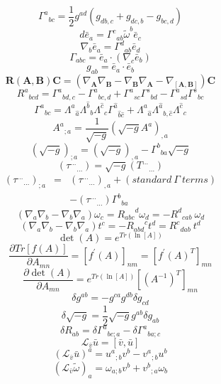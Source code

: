\documentclass[twocolumn]{article}
\begin{document}
\[
   {\Gamma^a}_{bc} = \frac{1}{2} g^{ad}
                     \left( g_{db,c} + g_{dc,b} - g_{bc,d} \right)
\]
\[
   d {\bar e}_a = {\Gamma^c}_{ab} {\tilde \omega}^b {\bar e}_c
\]
\[
   \nabla_b {\bar e}_a = {\Gamma^d}_{ab} {\bar e}_d
\]
\[
   \Gamma_{abc} = {\bar e}_a \cdot \left( \nabla_c {\bar e}_b \right)
\]
\[
   g_{ab} = {\bar e}_a \cdot {\bar e}_b
\]
\[
   \mathbf{R(A,B)C} = \left( \nabla_{\mathbf{A}} \nabla_{\mathbf{B}}
                         -   \nabla_{\mathbf{B}} \nabla_{\mathbf{A}}
                         -   \nabla_{[\mathbf{A},\mathbf{B}]} \right)
                         \mathbf{C}
\]
\[
   {R^{a}}_{bcd} = {\Gamma^{a}}_{bd,c} - {\Gamma^{a}}_{bc,d}
                  +{\Gamma^{a}}_{sc}{\Gamma^{s}}_{bd}
                  -{\Gamma^{a}}_{sd}{\Gamma^{s}}_{bc}
\]
\[
   {\Gamma^a}_{bc} = {\Lambda^a}_{\hat a}{\Lambda^{\hat b}}_{b}
                     {\Lambda^{\hat c}}_{c}{\Gamma^{\hat a}}_{{\hat b}{\hat c}}
                    +{\Lambda^a}_{\hat a}{\Lambda^{\hat a}}_{b,{\hat c}}
                     {\Lambda^{\hat c}}_{c}
\]
\[
   {A^a}_{;a} = \frac{1}{\sqrt{-g}} \left( \sqrt{-g} A^a \right)_{,a}
\]
\[
   \left( \sqrt{-g} \right)_{;a} = \left( \sqrt{-g} \right)_{,a}
                                 - {\Gamma^b}_{ba} \sqrt{-g}
\]
\[
   \left( {\tau^{\ldots}}_{\ldots} \right) = \sqrt{-g}
                                            \left( {T^{\ldots}}_{\ldots} \right)
\]
\begin{eqnarray*}
   \left( {\tau^{\ldots}}_{\ldots} \right)_{;a} & = &
   \left( {\tau^{\ldots}}_{\ldots} \right)_{,a}
   + \left( standard \ \Gamma \ terms \right)  \\
  & &  - \left( {\tau^{\ldots}}_{\ldots} \right) {\Gamma^b}_{ba}
\end{eqnarray*}
\[
   \left( \nabla_a \nabla_b - \nabla_b \nabla_a \right) \omega_c = {R_{abc}}^d \omega_d = -{R^d}_{cab} \ \omega_d
\]
\[
   \left( \nabla_a \nabla_b - \nabla_b \nabla_a \right) t^c
   = -{R_{abd}}^{c} t^d
   = {R^c}_{dab} \ t^d
\]
\[
   \det(A) = e^{Tr{ \left( \ln \left[ A \right] \right) }}
\]
\[
   \frac{\partial Tr\left[ f(A) \right]}{\partial A_{mn}} =
   \left[ f^{'}(A) \right]_{nm} = \left[ f^{'}(A)^{T}\right]_{mn}
\]
\[
   \frac{\partial \det(A)}{\partial A_{mn}}
   = e^{Tr{ \left( \ln \left[ A \right] \right) }}
   \left[ \left( A^{-1} \right)^{T}\right]_{mn}
\]
\[
   \delta g^{ab} = - g^{ca} g^{db} \delta g_{cd}
\]
\[
   \delta \sqrt{-g} = \frac{1}{2} \sqrt{-g} g^{ab} \delta g_{ab}
\]
\[
  \delta R_{ab} = \delta {\Gamma^a}_{bc;a} - \delta {\Gamma^a}_{ba;c}
\]
\[
  {\mathcal L}_{\bar v} {\bar u} = \left[{\bar v},{\bar u}\right]
\]
\[
  \left({\mathcal L}_{\bar v}{\bar u}\right)^{a} = {u^a}_{;b}v^b - {v^a}_{;b}u^b
\]
\[
  \left({\mathcal L}_{\bar v}{\tilde \omega}\right)_{a} = {\omega}_{a;b}v^b + {v^b}_{;a}\omega_b
\]
\end{document}
